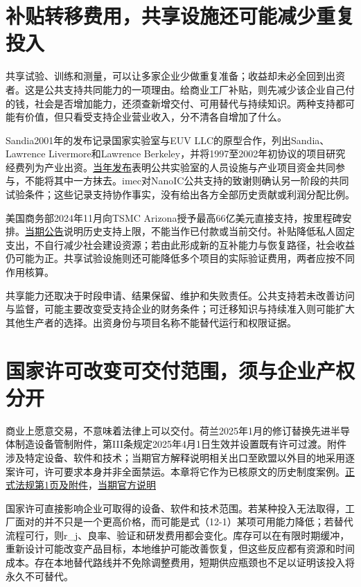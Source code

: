 \documentclass[UTF8,fontset=windows,12pt,a4paper,oneside,openany]{ctexbook}
\begin{document}
\section{补贴转移费用，共享设施还可能减少重复投入}

共享试验、训练和测量，可以让多家企业少做重复准备；收益却未必全回到出资者。这是公共支持共同能力的一项理由。给商业工厂补贴，则先减少该企业自己付的钱，社会是否增加能力，还须查新增交付、可用替代与持续知识。两种支持都可能有价值，但只看受支持企业营业收入，分不清各自增加了什么。

Sandia2001年的发布记录国家实验室与EUV LLC的原型合作，列出Sandia、Lawrence Livermore和Lawrence Berkeley，并将1997至2002年初协议的项目研究经费列为产业出资。\href{https://newsreleases.sandia.gov/partners-unveil-first-extreme-ultraviolet-chip-making-machine/}{当年发布}表明公共实验室的人员设施与产业项目资金共同参与，不能将其中一方抹去。imec对NanoIC公共支持的致谢则确认另一阶段的共同试验条件；这些记录支持协作事实，没有给出各方全部历史贡献或利润分配比例。

美国商务部2024年11月向TSMC Arizona授予最高66亿美元直接支持，按里程碑安排。\href{https://www.nist.gov/news-events/news/2024/11/biden-harris-administration-announces-chips-incentives-award-tsmc-arizona}{当期公告}说明历史支持上限，不能当作已付款或当前交付。补贴降低私人固定支出，不自行减少社会建设资源；若由此形成新的互补能力与恢复路径，社会收益仍可能为正。共享试验设施则还可能降低多个项目的实际验证费用，两者应按不同作用核算。

共享能力还取决于时段申请、结果保留、维护和失败责任。公共支持若未改善访问与监督，可能主要改变受支持企业的财务条件；可迁移知识与持续准入则可能扩大其他生产者的选择。出资身份与项目名称不能替代运行和权限证据。

\section{国家许可改变可交付范围，须与企业产权分开}

商业上愿意交易，不意味着法律上可以交付。荷兰2025年1月的修订替换先进半导体制造设备管制附件，第III条规定2025年4月1日生效并设置既有许可过渡。附件涉及特定设备、软件和技术；当期官方解释说明相关出口至欧盟以外目的地采用逐案许可，许可要求本身并非全面禁运。本章将它作为已核原文的历史制度案例。\href{https://zoek.officielebekendmakingen.nl/stcrt-2025-1894.pdf}{正式法规第1页及附件}，\href{https://www.government.nl/latest/news/2025/01/15/klever-export-controls-on-advanced-semiconductor-manufacturing-equipment-to-be-tightened}{当期官方说明}

国家许可直接影响企业可取得的设备、软件和技术范围。若某种投入无法取得，工厂面对的并不只是一个更高价格，而可能是式（12-1）某项可用能力降低；若替代流程可行，则r\_j、良率、验证和研发费用都会变化。库存可以在有限时期缓冲，重新设计可能改变产品目标，本地维护可能改善恢复，但这些反应都有资源和时间成本。存在本地替代路线并不免除调整费用，短期供应瓶颈也不足以证明该投入将永久不可替代。
\end{document}
